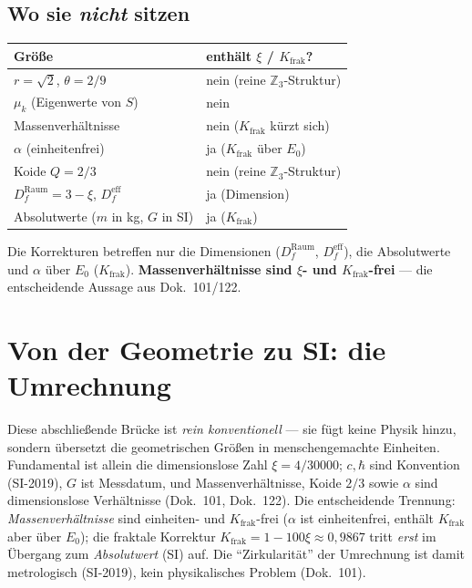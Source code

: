 \subsection{Wo sie \emph{nicht} sitzen}
\begin{center}
\begin{tabular}{@{}p{5.2cm} p{6cm}@{}}
\toprule
Gr\"o\ss e & enth\"alt $\xi$ / $K_{\text{frak}}$? \\
\midrule
$r=\sqrt2$, $\theta=2/9$ & nein (reine $\mathbb{Z}_3$-Struktur) \\
$\mu_k$ (Eigenwerte von $S$) & nein \\
Massenverh\"altnisse & nein ($K_{\text{frak}}$ k\"urzt sich) \\
$\alpha$ (einheitenfrei) & ja ($K_{\text{frak}}$ \"uber $E_0$) \\
Koide $Q=2/3$ & nein (reine $\mathbb{Z}_3$-Struktur) \\
$D_f^{\text{Raum}}=3-\xi$, $D_f^{\text{eff}}$ & ja (Dimension) \\
Absolutwerte ($m$ in kg, $G$ in SI) & ja ($K_{\text{frak}}$) \\
\bottomrule
\end{tabular}
\end{center}
Die Korrekturen betreffen nur die Dimensionen ($D_f^{\text{Raum}}$, $D_f^{\text{eff}}$), die
Absolutwerte und $\alpha$ \"uber $E_0$ ($K_{\text{frak}}$). \textbf{Massenverh\"altnisse sind $\xi$- und $K_{\text{frak}}$-frei} --- die
entscheidende Aussage aus Dok.~101/122.

\section{Von der Geometrie zu SI: die Umrechnung}
Diese abschlie\ss ende Br\"ucke ist \emph{rein konventionell} --- sie f\"ugt keine Physik hinzu,
sondern \"ubersetzt die geometrischen Gr\"o\ss en in menschengemachte Einheiten. Fundamental ist
allein die dimensionslose Zahl $\xi=4/30000$; $c,\hbar$ sind Konvention (SI-2019), $G$ ist Messdatum,
und Massenverh\"altnisse, Koide $2/3$ sowie $\alpha$ sind dimensionslose Verh\"altnisse (Dok.~101,
Dok.~122). Die entscheidende Trennung: \emph{Massenverh\"altnisse} sind einheiten- und
$K_{\text{frak}}$-frei ($\alpha$ ist einheitenfrei, enth\"alt $K_{\text{frak}}$ aber \"uber $E_0$); die fraktale Korrektur $K_{\text{frak}}=1-100\xi\approx 0{,}9867$ tritt
\emph{erst} im \"Ubergang zum \emph{Absolutwert} (SI) auf. Die \enquote{Zirkularit\"at} der Umrechnung
ist damit metrologisch (SI-2019), kein physikalisches Problem (Dok.~101).

